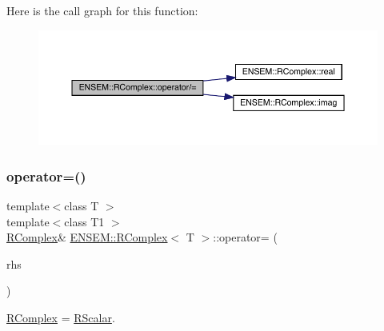 Here is the call graph for this function\+:
\nopagebreak
\begin{figure}[H]
\begin{center}
\leavevmode
\includegraphics[width=350pt]{d9/d0e/classENSEM_1_1RComplex_af06d63062569441e7fc7bb532334a109_cgraph}
\end{center}
\end{figure}
\mbox{\label{classENSEM_1_1RComplex_a6553ee6381e82a410c0c531fde8e3fee}} 
\subsubsection{\texorpdfstring{operator=()}{operator=()}\hspace{0.1cm}{\footnotesize\ttfamily [1/6]}}
{\footnotesize\ttfamily template$<$class T $>$ \\
template$<$class T1 $>$ \\
\mbox{\hyperlink{classENSEM_1_1RComplex}{R\+Complex}}\& \mbox{\hyperlink{classENSEM_1_1RComplex}{E\+N\+S\+E\+M\+::\+R\+Complex}}$<$ T $>$\+::operator= (\begin{DoxyParamCaption}\item[{const \mbox{\hyperlink{classENSEM_1_1RScalar}{R\+Scalar}}$<$ T1 $>$ \&}]{rhs }\end{DoxyParamCaption})\hspace{0.3cm}{\ttfamily [inline]}}



\mbox{\hyperlink{classENSEM_1_1RComplex}{R\+Complex}} = \mbox{\hyperlink{classENSEM_1_1RScalar}{R\+Scalar}}. 

